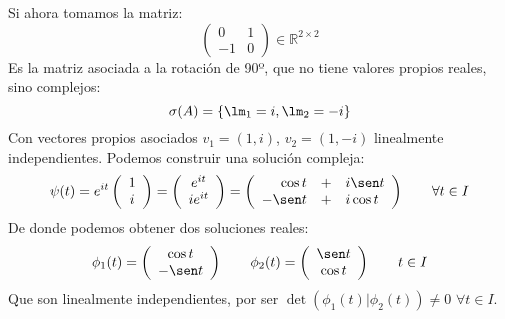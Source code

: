 \begin{ejemplo}
    Si ahora tomamos la matriz:
    \begin{equation*}
        \left(\begin{array}{cc}
                0 & 1 \\
                -1 & 0
        \end{array}\right) \in \mathbb{R}^{2\times 2}
    \end{equation*}
    Es la matriz asociada a la rotación de 90º, que no tiene valores propios reales, sino complejos:
    \begin{equation*}
        \sigma(A) = \{\lm_1 = i, \lm_2 = -i\}
    \end{equation*}
    Con vectores propios asociados $v_1=(1,i)$, $v_2=(1,-i)$ linealmente independientes. Podemos construir una solución compleja:
    \begin{equation*}
        \psi(t) = e^{it} 
        \left(\begin{array}{c}
                1\\
                i
        \end{array}\right) = 
        \left(\begin{array}{c}
                e^{it} \\
                ie^{it}
        \end{array}\right) = 
        \left(\begin{array}{rcl}
                \cos t &+& i\sen t \\
                -\sen t &+& i\cos t
        \end{array}\right) \qquad \forall t\in I
    \end{equation*}
    De donde podemos obtener dos soluciones reales:
    \begin{equation*}
        \phi_1(t) = \left(\begin{array}{c}
            \cos t\\
            -\sen t
        \end{array}\right) \qquad 
        \phi_2(t) = \left(\begin{array}{c}
            \sen t\\
            \cos t
        \end{array}\right) \qquad t\in I
    \end{equation*}
    Que son linealmente independientes, por ser $\det(\phi_1(t)|\phi_2(t))\neq 0$ $\forall t\in I$.
\end{ejemplo}
